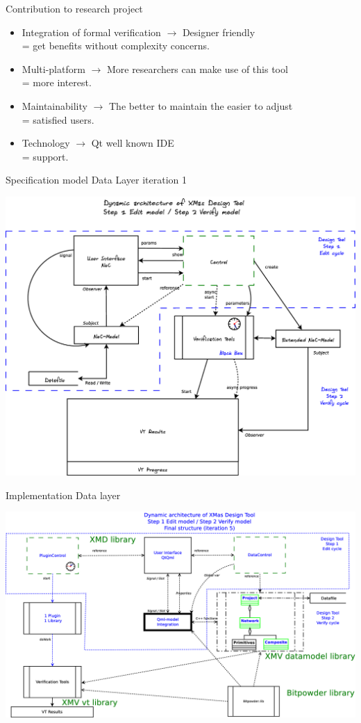 \documentclass[11pt]{beamer}
\begin{document}
\begin{frame}[t]{Contribution to research project}

	\begin{itemize}
		\item Integration of formal verification   $\rightarrow$  Designer friendly \\
		= get benefits without complexity concerns.
		\item Multi-platform $\rightarrow$ More researchers can make use of this tool \\
		= more interest.
		\item Maintainability   $\rightarrow$ The better to maintain the easier to adjust \\
		= satisfied users.
		\item Technology   $\rightarrow$ Qt well known IDE \\
		= support.		
	\end{itemize}
\end{frame}



\begin{frame}{Specification model Data Layer iteration 1}

	\includegraphics[width=.80\linewidth]{pictures/1c-architecture-dynamic-1}

\end{frame}

\begin{frame}{Implementation Data layer}

	\includegraphics[width=.90\linewidth]{pictures/1c-architecture-dynamic-2}

\end{frame}
\end{document}
